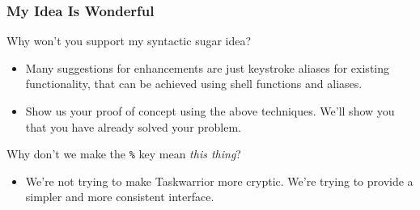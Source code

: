 \documentclass[t,handout]{beamer}
\begin{document}

\begin{frame}[fragile]\frametitle{My Idea Is Wonderful}
    Why won't you support my syntactic sugar idea?
    \begin{itemize}
        \item Many suggestions for enhancements are just keystroke aliases for existing functionality, that can be achieved using shell functions and aliases.
        \item Show us your proof of concept using the above techniques. We'll show you that you have already solved your problem.
    \end{itemize}

    Why don't we make the \verb=%= key mean \textit{this thing}?
    \begin{itemize}
        \item We're not trying to make Taskwarrior more cryptic. We're trying to provide a simpler and more consistent interface.
    \end{itemize}
\end{frame}
\end{document}
